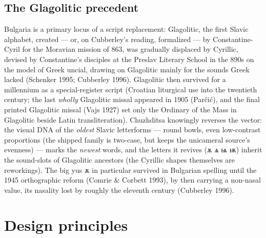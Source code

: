 \documentclass[11pt]{article}
\newcommand{\cz}[1]{{\chu #1}}
\begin{document}
\subsection{The Glagolitic precedent}
Bulgaria is a primary locus of a script replacement: Glagolitic, the first Slavic alphabet, created — or, on Cubberley's reading, formalized — by Constantine-Cyril for the Moravian mission of 863, was gradually displaced by Cyrillic, devised by Constantine's disciples at the Preslav Literary School in the 890s on the model of Greek uncial, drawing on Glagolitic mainly for the sounds Greek lacked (Schenker 1995; Cubberley 1996). Glagolitic then survived for a millennium as a special-register script (Croatian liturgical use into the twentieth century; the last \emph{wholly} Glagolitic missal appeared in 1905 (Par\v{c}i\'c), and the final printed Glagolitic missal (Vajs 1927) set only the Ordinary of the Mass in Glagolitic beside Latin transliteration). Chuzhditsa knowingly reverses the vector: the visual DNA of the \emph{oldest} Slavic letterforms — round bowls, even low-contrast proportions (the shipped family is two-case, but keeps the unicameral source's evenness) — marks the \emph{newest} words, and the letters it revives (\cz{ѫ ѧ ѩ ѭ}) inherit the sound-slots of Glagolitic ancestors (the Cyrillic shapes themselves are reworkings). The big yus \cz{ѫ} in particular survived in Bulgarian spelling until the 1945 orthographic reform (Comrie \& Corbett 1993), by then carrying a non-nasal value, its nasality lost by roughly the eleventh century (Cubberley 1996).

\section{Design principles}
\end{document}
